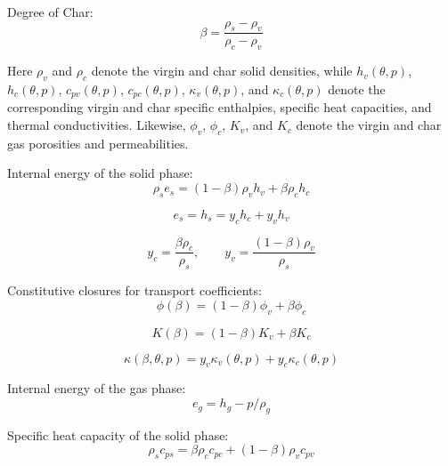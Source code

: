 \documentclass[11pt]{article}
\begin{document}

Degree of Char:
\begin{equation}
\beta = \frac{\rho_s - \rho_v}{\rho_c - \rho_v}
\end{equation}

Here $\rho_v$ and $\rho_c$ denote the virgin and char solid densities, while
$h_v(\theta,p)$, $h_c(\theta,p)$, $c_{pv}(\theta,p)$, $c_{pc}(\theta,p)$, $\kappa_v(\theta,p)$, and
$\kappa_c(\theta,p)$ denote the corresponding virgin and char specific enthalpies,
specific heat capacities, and thermal conductivities. Likewise, $\phi_v$,
$\phi_c$, $K_v$, and $K_c$ denote the virgin and char gas porosities and
permeabilities.

Internal energy of the solid phase:
\begin{equation}
\rho_{s} e_{s} = (1 - \beta) \rho_{v} h_{v} + \beta \rho_{c} h_{c}
\end{equation}

\begin{equation}
    e_{s} = h_{s} = y_{c} h_{c} + y_{v} h_{v}
\end{equation}

\begin{equation}
    y_{c} = \frac{\beta \rho_{c}}{\rho_{s}}, \qquad y_{v} = \frac{(1 - \beta) \rho_{v}}{\rho_{s}}
\end{equation}

Constitutive closures for transport coefficients:
\begin{equation}
\phi(\beta) = (1 - \beta)\phi_v + \beta \phi_c
\end{equation}

\begin{equation}
K(\beta) = (1 - \beta)K_v + \beta K_c
\end{equation}

\begin{equation}
\kappa(\beta, \theta, p) = y_v \kappa_v(\theta,p) + y_c \kappa_c(\theta,p)
\end{equation}

Internal energy of the gas phase:
\begin{equation}
e_{g} = h_{g} - p/\rho_{g}
\end{equation}

Specific heat capacity of the solid phase:
\begin{equation}
\rho_{s} c_{ps} = \beta \rho_{c} c_{pc} + (1 - \beta) \rho_{v} c_{pv}
\end{equation}
\end{document}
